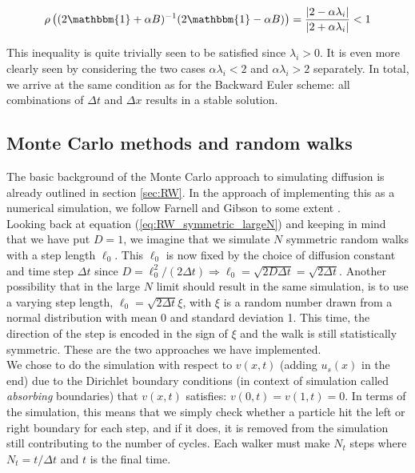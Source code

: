 \documentclass[a4paper, 11pt, notitlepage,english]{article}
\newcommand{\id}{\mathbbm{1}}
\begin{document}
\begin{equation}
\rho\left( (2\id + \alpha B)^{-1}(2\id -\alpha B) \right) = \frac{\lvert 2-\alpha \lambda_i\rvert}{\lvert 2+\alpha \lambda_i \rvert} < 1
\label{eq:Crank_Nicolson_spectralrad}
\end{equation}

This inequality is quite trivially seen to be satisfied since $\lambda_i > 0$. It is even more clearly seen by considering the two cases $\alpha\lambda_i < 2$ and $\alpha\lambda_i > 2$ separately. In total, we arrive at the same condition as for the Backward Euler scheme: all combinations of $\Delta t$ and $\Delta x$ results in a stable solution.

\subsection{Monte Carlo methods and random walks}
\label{sec:MC_method}
The basic background of the Monte Carlo approach to simulating diffusion is already outlined in section \ref{sec:RW}. In the approach of implementing this as a numerical simulation, we follow Farnell and Gibson to some extent \cite{Farnell}. \\

Looking back at equation (\ref{eq:RW_symmetric_largeN}) and keeping in mind that we have put $D = 1$, we imagine that we simulate $N$ symmetric random walks with a step length $\ell_0$. This $\ell_0$ is now fixed by the choice of diffusion constant and time step $\Delta t$ since $D = \ell_0^2/(2\Delta t) \Rightarrow \ell_0 = \sqrt{2D\Delta t} = \sqrt{2\Delta t}$. Another possibility that in the large $N$ limit should result in the same simulation, is to use a varying step length, $\ell_0 = \sqrt{2\Delta t}\xi$, with $\xi$ is a random number drawn from a normal distribution with mean 0 and standard deviation 1. This time, the direction of the step is encoded in the sign of $\xi$ and the walk is still statistically symmetric. These are the two approaches we have implemented.\\

We chose to do the simulation with respect to $v(x,t)$ (adding $u_s(x)$ in the end) due to the Dirichlet boundary conditions (in context of simulation called \emph{absorbing} boundaries) that $v(x,t)$ satisfies: $v(0,t) = v(1,t) = 0$. In terms of the simulation, this means that we simply check whether a particle hit the left or right boundary for each step, and if it does, it is removed from the simulation still contributing to the number of cycles. Each walker must make $N_t$ steps where $N_t = t/\Delta t$ and $t$ is the final time. \\
\end{document}
